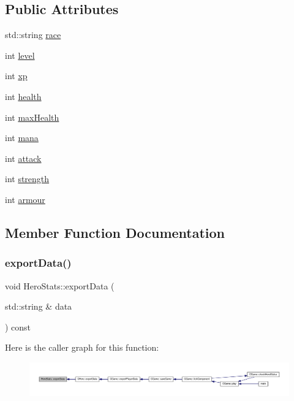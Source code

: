 \subsection*{Public Attributes}
\begin{DoxyCompactItemize}
\item 
std\+::string \mbox{\hyperlink{struct_hero_stats_a7e2b54df848419e4dc4ce0a418a20fcd}{race}}
\item 
int \mbox{\hyperlink{struct_hero_stats_a75d21979e2c22b304618fb6c35e81b74}{level}}
\item 
int \mbox{\hyperlink{struct_hero_stats_a88fe51932e635e55e3b94cc14abb69cf}{xp}}
\item 
int \mbox{\hyperlink{struct_hero_stats_a37ae89eeb0fe2923a75e1e5fde2a8f04}{health}}
\item 
int \mbox{\hyperlink{struct_hero_stats_a7916c795b62c91b90abe02c42407b0fe}{max\+Health}}
\item 
int \mbox{\hyperlink{struct_hero_stats_af703b4ea4f05faa5bdb4343f0c9d7fd6}{mana}}
\item 
int \mbox{\hyperlink{struct_hero_stats_a0e7d6e8ea8364bb0aed65dc149c5a8c4}{attack}}
\item 
int \mbox{\hyperlink{struct_hero_stats_a20e60d036dce0856e1910a4a5889b9fa}{strength}}
\item 
int \mbox{\hyperlink{struct_hero_stats_af664c2d0a61bcf3ca19191f73cf8bb06}{armour}}
\end{DoxyCompactItemize}


\subsection{Member Function Documentation}
\mbox{\label{struct_hero_stats_a9580a49eab11c0babd042b6e7e551e4e}} 
\subsubsection{\texorpdfstring{export\+Data()}{exportData()}}
{\footnotesize\ttfamily void Hero\+Stats\+::export\+Data (\begin{DoxyParamCaption}\item[{std\+::string \&}]{data }\end{DoxyParamCaption}) const}

Here is the caller graph for this function\+:\nopagebreak
\begin{figure}[H]
\begin{center}
\leavevmode
\includegraphics[width=350pt]{struct_hero_stats_a9580a49eab11c0babd042b6e7e551e4e_icgraph}
\end{center}
\end{figure}
\mbox{\label{struct_hero_stats_af28870ab75d59129709abd0b84670a43}} 
